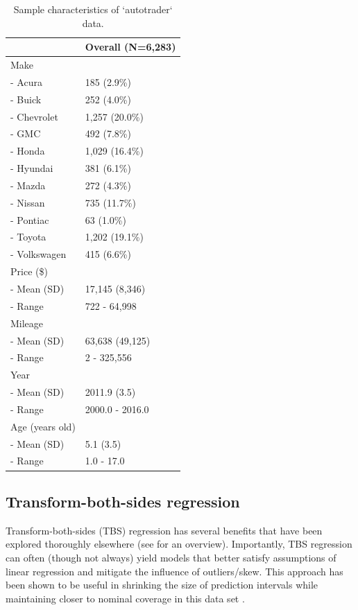 \begin{Schunk}
\begin{table}

\caption{\label{tab:unnamed-chunk-10}Sample characteristics of `autotrader` data.}
\centering
\begin{tabular}[t]{ll}
\toprule
 & Overall (N=6,283)\\
\midrule
Make & \\
-  Acura & 185 (2.9\%)\\
-  Buick & 252 (4.0\%)\\
-  Chevrolet & 1,257 (20.0\%)\\
-  GMC & 492 (7.8\%)\\
-  Honda & 1,029 (16.4\%)\\
-  Hyundai & 381 (6.1\%)\\
-  Mazda & 272 (4.3\%)\\
-  Nissan & 735 (11.7\%)\\
-  Pontiac & 63 (1.0\%)\\
-  Toyota & 1,202 (19.1\%)\\
-  Volkswagen & 415 (6.6\%)\\
Price (\$) & \\
-  Mean (SD) & 17,145 (8,346)\\
-  Range & 722 - 64,998\\
Mileage & \\
-  Mean (SD) & 63,638 (49,125)\\
-  Range & 2 - 325,556\\
Year & \\
-  Mean (SD) & 2011.9 (3.5)\\
-  Range & 2000.0 - 2016.0\\
Age (years old) & \\
-  Mean (SD) & 5.1 (3.5)\\
-  Range & 1.0 - 17.0\\
\bottomrule
\end{tabular}
\end{table}

\end{Schunk}

\hypertarget{transform-both-sides-regression}{%
\subsection{Transform-both-sides
regression}\label{transform-both-sides-regression}}

Transform-both-sides (TBS) regression has several benefits that have
been explored thoroughly elsewhere (see \citet{harrell} for an
overview). Importantly, TBS regression can often (though not always)
yield models that better satisfy assumptions of linear regression and
mitigate the influence of outliers/skew. This approach has been shown to
be useful in shrinking the size of prediction intervals while
maintaining closer to nominal coverage in this data set
\citep{orq_paper}.

